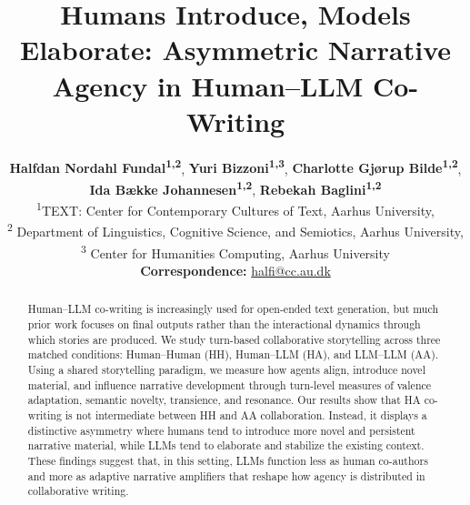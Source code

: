 \documentclass[11pt]{article}
\title{Humans Introduce, Models Elaborate: Asymmetric Narrative Agency in Human--LLM Co-Writing}
\author{
  \textbf{Halfdan Nordahl Fundal\textsuperscript{1,2}},
  \textbf{Yuri Bizzoni\textsuperscript{1,3}},
  \textbf{Charlotte Gjørup Bilde\textsuperscript{1,2}}, \\
  \textbf{Ida Bække Johannesen\textsuperscript{1,2}},
  \textbf{Rebekah Baglini\textsuperscript{1,2}} \\
  \textsuperscript{1}TEXT: Center for Contemporary Cultures of Text, Aarhus University,\\
  \textsuperscript{2} Department of Linguistics, Cognitive Science, and Semiotics, Aarhus University,\\
  \textsuperscript{3} Center for Humanities Computing, Aarhus University
\\
  \small{
    \textbf{Correspondence:} \href{mailto:halfi@cc.au.dk}{halfi@cc.au.dk}
  }
}
\begin{document}
\maketitle

\begin{abstract}
Human--LLM co-writing is increasingly used for open-ended text generation, but much prior work focuses on final outputs rather than the interactional dynamics through which stories are produced. We study turn-based collaborative storytelling across three matched conditions: Human--Human (HH), Human--LLM (HA), and LLM--LLM (AA). Using a shared storytelling paradigm, we measure how agents align, introduce novel material, and influence narrative development through turn-level measures of valence adaptation, semantic novelty, transience, and resonance. Our results show that HA co-writing is not intermediate between HH and AA collaboration. Instead, it displays a distinctive asymmetry where humans tend to introduce more novel and persistent narrative material, while LLMs tend to elaborate and stabilize the existing context. These findings suggest that, in this setting, LLMs function less as human co-authors and more as adaptive narrative amplifiers that reshape how agency is distributed in collaborative writing.
\end{abstract}
\end{document}
